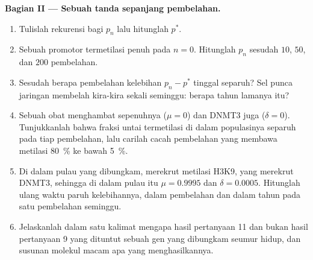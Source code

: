 \begin{problem}
\medskip
\noindent\textbf{Bagian II --- Sebuah tanda sepanjang pembelahan.}
\begin{enumerate}[resume]
  \item Tulislah rekurensi bagi $p_{n}$ lalu hitunglah $p^{*}$.
  \item Sebuah  promotor termetilasi penuh pada $n = 0$. Hitunglah $p_{n}$
        sesudah $10$, $50$, dan $200$ pembelahan.
  \item Sesudah berapa pembelahan kelebihan $p_{n} - p^{*}$ tinggal separuh?
        Sel punca jaringan membelah kira-kira sekali seminggu: berapa tahun
        lamanya itu?
  \item Sebuah obat menghambat  sepenuhnya ($\mu = 0$) dan DNMT3 juga
        ($\delta = 0$). Tunjukkanlah bahwa fraksi untai termetilasi di dalam
        populasinya separuh pada tiap pembelahan, lalu carilah cacah
        pembelahan yang membawa metilasi \qty{80}{\%} ke bawah \qty{5}{\%}.
  \item Di dalam pulau yang dibungkam,   merekrut metilasi
        H3K9, yang merekrut DNMT3, sehingga di dalam pulau itu
        $\mu = 0.9995$ dan $\delta = 0.0005$. Hitunglah ulang waktu paruh
        kelebihannya, dalam pembelahan dan dalam tahun pada satu pembelahan
        seminggu.
  \item Jelaskanlah dalam satu kalimat mengapa hasil pertanyaan 11 dan bukan
        hasil pertanyaan 9 yang dituntut sebuah gen yang dibungkam seumur
        hidup, dan susunan molekul macam apa yang menghasilkannya.
\end{enumerate}


\end{problem}
